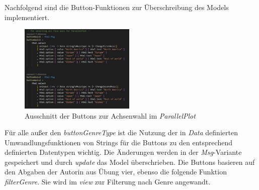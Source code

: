 \documentclass[usegeometry=true]{scrartcl}
\begin{document}
Nachfolgend sind die Button-Funktionen zur Überschreibung des Models implementiert.
\begin{figure}
        \includegraphics[width=5.5cm]{Bilder/Code_ButtonsForParallel.png}
        \caption{Ausschnitt der Buttons zur Achsenwahl im \textit{ParallelPlot}}
        \label{fig:Buttons}
\end{figure}
Für alle außer den \textit{buttonGenreType} ist die Nutzung der in \textit{Data} definierten Umwandlungsfunktionen 
von Strings für die Buttons zu den entsprechend definierten Datentypen wichtig. 
Die Änderungen werden in der \textit{Msg}-Variante gespeichert und durch \textit{update} das Model überschrieben.
Die Buttons basieren auf den Abgaben der Autorin aus Übung vier, ebenso die folgende Funktion \textit{filterGenre}. 
Sie wird im \textit{view} zur Filterung nach Genre angewandt.
\end{document}
